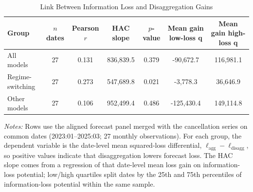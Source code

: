 \begin{table}[htbp]
\centering
\scriptsize
\caption{Link Between Information Loss and Disaggregation Gains}
\label{tab:cancellation_forecast_link}
\begin{tabular}{lcccccc}
\toprule
Group & $n$ dates & Pearson $r$ & HAC slope & $p$-value & Mean gain low-loss q & Mean gain high-loss q \\
\midrule
All models & 27 & 0.131 & 836,839.5 & 0.379 & -90,672.7 & 116,981.1 \\
Regime-switching & 27 & 0.273 & 547,689.8 & 0.021 & -3,778.3 & 36,646.9 \\
Other models & 27 & 0.106 & 952,499.4 & 0.486 & -125,430.4 & 149,114.8 \\
\bottomrule
\end{tabular}
\begin{tablenotes}
\footnotesize
\item \textit{Notes:} Rows use the aligned forecast panel merged with the cancellation series on common dates (2023:01--2025:03; 27 monthly observations). For each group, the dependent variable is the date-level mean squared-loss differential, $\ell_{\mathrm{agg}} - \ell_{\mathrm{disagg}}$, so positive values indicate that disaggregation lowers forecast loss. The HAC slope comes from a regression of that date-level mean loss gain on information-loss potential; low/high quartiles split dates by the 25th and 75th percentiles of information-loss potential within the same sample.
\end{tablenotes}
\end{table}
